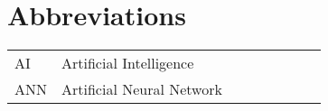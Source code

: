 \chapter{Abbreviations}
%
\begin{supertabular}{p{0.15\linewidth}p{0.80\linewidth}p{0.05}}
AI & Artificial Intelligence\\
ANN & Artificial Neural Network\\
\end{supertabular}
